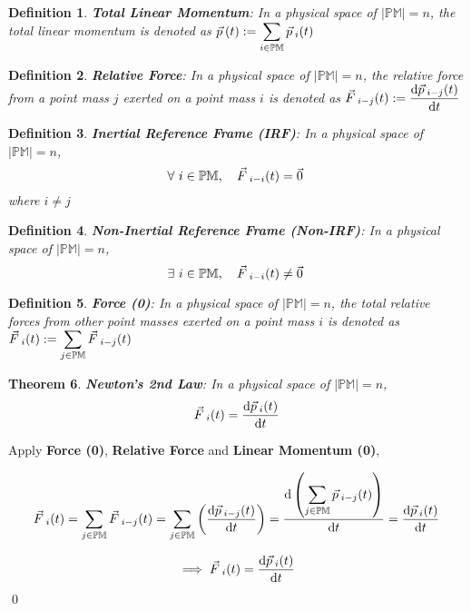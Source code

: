 \documentclass[12pt]{amsart}
\newtheorem{theorem}{Theorem}[section]
\newtheorem{definition}[theorem]{Definition}
\renewenvironment{proof}{{\bfseries Proof.}}{\qed}
\let\oldvec\vec
\renewcommand{\vec}[1]{\oldvec{#1}\hspace{0.1em}}
\begin{document}
\begin{definition}
\textbf{Total Linear Momentum}: In a physical space of $\left | \mathbb{PM} \right | = n$, the total linear momentum is denoted as $\vec{p}(t) := \displaystyle \sum_{i \in \mathbb{PM}} \vec{p}_{i} (t)$ 
\end{definition}

\begin{definition}
\textbf{Relative Force}: In a physical space of $\left | \mathbb{PM} \right | = n$, the relative force from a point mass $j$ exerted on a point mass $i$ is denoted as $  \vec{F}_{i-j}(t) := \dfrac{\mathrm{d} \vec{p}_{i-j} (t)}{\mathrm{d} t} $
\end{definition}

\begin{definition}
\textbf{Inertial Reference Frame (IRF)}: In a physical space of $\left | \mathbb{PM} \right | = n$, $$  \forall \  i \in \mathbb{PM}, \quad \vec{F}_{i-i}(t)=\vec{0} $$
where $i\ne j$
\end{definition}

\begin{definition}
\textbf{Non-Inertial Reference Frame (Non-IRF)}: In a physical space of $\left | \mathbb{PM} \right | = n$,$$\exists \  i \in \mathbb{PM}, \quad \vec{F}_{i-i} (t)\ne \vec{0} $$
\end{definition}

\begin{definition}
\textbf{Force (0)}: In a physical space of $\left | \mathbb{PM} \right | = n$, the total relative forces from other point masses exerted on a point mass $i$ is denoted as $\vec{F}_{i}(t):= \displaystyle \sum_{j \in \mathbb{PM}} \vec{F}_{i-j}(t) $
\end{definition}

\begin{theorem}
 \textbf{Newton's 2nd Law}: In a physical space of $\left | \mathbb{PM} \right | = n$, $$ \vec{F}_{i}(t) = \dfrac{\mathrm{d} \vec{p}_{i}(t)}{\mathrm{d} t} $$
\end{theorem}

\begin{proof}
Apply \textbf{Force (0)}, \textbf{Relative Force} and \textbf{Linear Momentum (0)},

$$ \vec{F}_{i}(t) = \displaystyle \sum_{j \in \mathbb{PM}} \vec{F}_{i-j}(t) = \displaystyle \sum_{j \in \mathbb{PM}} \left ( \dfrac{\mathrm{d} \vec{p}_{i-j} (t)}{\mathrm{d} t} \right ) = \dfrac{\mathrm{d} \left (  \displaystyle \sum_{j \in \mathbb{PM}} \vec{p}_{i-j} (t) \right ) }{\mathrm{d} t} = \dfrac{\mathrm{d}  \vec{p}_{i} (t)}{\mathrm{d} t} $$

$$ \implies \vec{F}_{i}(t) = \dfrac{\mathrm{d}  \vec{p}_{i} (t)}{\mathrm{d} t} $$
\end{proof}
\end{document}
